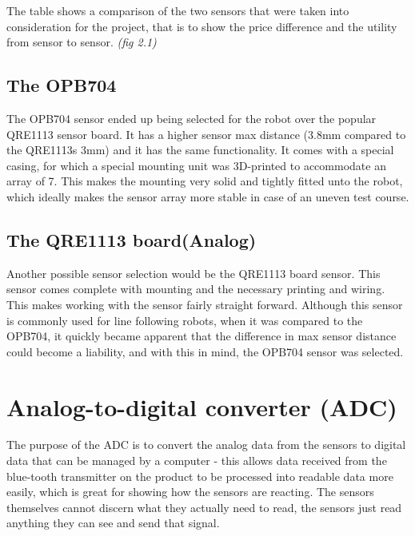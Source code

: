 The table shows a comparison of the two sensors that were taken into consideration for the project, that is to show the price difference and the utility from sensor to sensor. \emph{(fig 2.1)}



\subsection{The OPB704}

The OPB704 sensor ended up being selected for the robot over the popular QRE1113 sensor board. It has a higher sensor max distance (3.8mm compared to the QRE1113s 3mm) and it has the same functionality. It comes with a special casing, for which a special mounting unit was 3D-printed to accommodate an array of 7. This makes the mounting very solid and tightly fitted unto the robot, which ideally makes the sensor array more stable in case of an uneven test course.


\subsection{The QRE1113 board(Analog)}

Another possible sensor selection would be the QRE1113 board sensor. This sensor comes complete with mounting and the necessary printing and wiring. This makes working with the sensor fairly straight forward. Although this sensor is commonly used for line following robots, when it was compared to the OPB704, it quickly became apparent that the difference in max sensor distance could become a liability, and with this in mind, the OPB704 sensor was selected.




\section{Analog-to-digital converter (ADC)}

The purpose of the ADC is to convert the analog data from the sensors to digital data that can be managed by a computer - this allows data received from the blue-tooth transmitter on the product to be processed into readable data more easily, which is great for showing how the sensors are reacting. The sensors themselves cannot discern what they actually need to read, the sensors just read anything they can see and send that signal.

